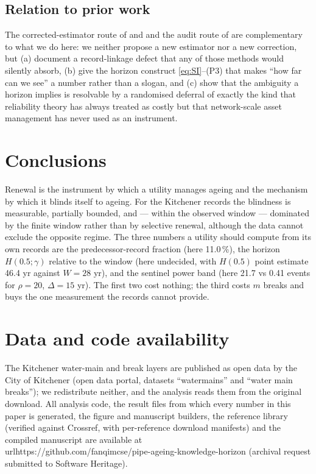 \documentclass[review,12pt,authoryear]{elsarticle}
\begin{document}
\subsection{Relation to prior work}
The corrected-estimator route of \citet{Scheidegger2013} and
\citet{LeGat2013} and the audit route of \citet{Bartlett2014} are
complementary to what we do here: we neither propose a new estimator nor a
new correction, but (a) document a record-linkage defect that any of those
methods would silently absorb, (b) give the horizon construct
\eqref{eq:SI}--(P3) that makes ``how far can we see'' a number rather than a
slogan, and (c) show that the ambiguity a horizon implies is resolvable by a
randomised deferral of exactly the kind that reliability theory has always
treated as costly \citep{BarlowProschan1965,Drent2020} but that network-scale
asset management has never used as an instrument.

\section{Conclusions}
\label{sec:conclusions}

Renewal is the instrument by which a utility manages ageing and the mechanism
by which it blinds itself to ageing. For the Kitchener records the blindness
is measurable, partially bounded, and --- within the observed window ---
dominated by the finite window rather than by selective renewal, although
the data cannot exclude the opposite regime. The three numbers a utility
should compute from its own records are the predecessor-record fraction
(here 11.0\,\%), the horizon $H(0.5;\gamma)$ relative to the window
(here undecided, with $H(0.5)$ point estimate 46.4 yr against
$W=28$ yr), and the sentinel power band (here
21.7 vs 0.41 events for $\rho=20$, $\Delta=15$ yr). The
first two cost nothing; the third costs $m$ breaks and buys the one
measurement the records cannot provide.

\section*{Data and code availability}
The Kitchener water-main and break layers are published as open data by the
City of Kitchener (open data portal, datasets ``watermains'' and ``water main
breaks''); we redistribute neither, and the analysis reads them from the
original download. All analysis code, the result files from which every
number in this paper is generated, the figure and manuscript builders, the
reference library (verified against Crossref, with per-reference download
manifests) and the compiled manuscript are available at
\\url{https://github.com/fanqimcse/pipe-ageing-knowledge-horizon}
(archival request submitted to Software Heritage).
\end{document}
